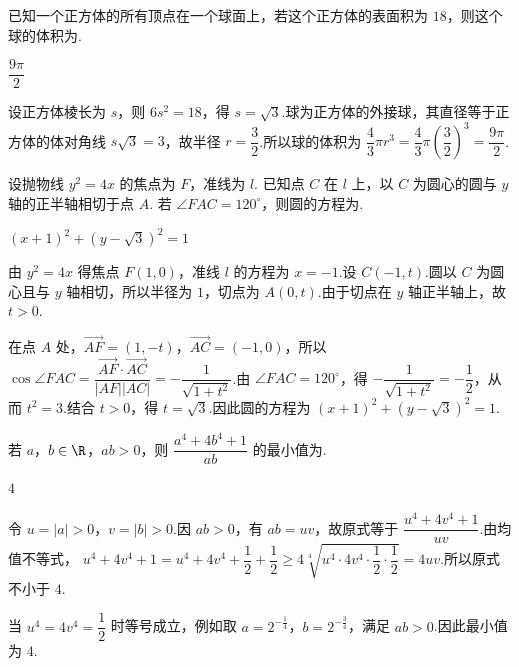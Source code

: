 \begin{problem}
已知一个正方体的所有顶点在一个球面上，若这个正方体的表面积为 \(18\)，则这个球的体积为\fillinblank{}.
\end{problem}

\begin{answer}
\(\dfrac{9\pi}{2}\)
\end{answer}

\begin{solution}
设正方体棱长为 \(s\)，则 \(6s^2=18\)，得 \(s=\sqrt3\).球为正方体的外接球，其直径等于正方体的体对角线 \(s\sqrt3=3\)，故半径 \(r=\dfrac32\).所以球的体积为 \(\dfrac43\pi r^3=\dfrac43\pi\left(\dfrac32\right)^3=\dfrac{9\pi}{2}\).
\end{solution}

\begin{problem}
设抛物线 \(y^2=4x\) 的焦点为 \(F\)，准线为 \(l\). 已知点 \(C\) 在 \(l\) 上，以 \(C\) 为圆心的圆与 \(y\) 轴的正半轴相切于点 \(A\). 若 \(\angle FAC=120^\circ\)，则圆的方程为\fillinblank{}.
\end{problem}

\begin{answer}
\(\left(x+1\right)^2+\left(y-\sqrt{3}\right)^2=1\)
\end{answer}

\begin{solution}
由 \(y^2=4x\) 得焦点 \(F(1,0)\)，准线 \(l\) 的方程为 \(x=-1\).设 \(C(-1,t)\).圆以 \(C\) 为圆心且与 \(y\) 轴相切，所以半径为 \(1\)，切点为 \(A(0,t)\).由于切点在 \(y\) 轴正半轴上，故 \(t>0\).

在点 \(A\) 处，\(\overrightarrow{AF}=(1,-t)\)，\(\overrightarrow{AC}=(-1,0)\)，所以
\(\cos\angle FAC=\dfrac{\overrightarrow{AF}\cdot\overrightarrow{AC}}{|AF||AC|}=-\dfrac1{\sqrt{1+t^2}}\).由 \(\angle FAC=120^\circ\)，得 \(-\dfrac1{\sqrt{1+t^2}}=-\dfrac12\)，从而 \(t^2=3\).结合 \(t>0\)，得 \(t=\sqrt3\).因此圆的方程为 \(\left(x+1\right)^2+\left(y-\sqrt3\right)^2=1\).
\end{solution}

\begin{problem}
若 \(a\)，\(b\in\R\)，\(ab>0\)，则 \(\dfrac{a^4+4b^4+1}{ab}\) 的最小值为\fillinblank{}.
\end{problem}

\begin{answer}
\(4\)
\end{answer}

\begin{solution}
令 \(u=|a|>0\)，\(v=|b|>0\).因 \(ab>0\)，有 \(ab=uv\)，故原式等于 \(\dfrac{u^4+4v^4+1}{uv}\).由均值不等式，
\(u^4+4v^4+1=u^4+4v^4+\dfrac12+\dfrac12\ge4\sqrt[4]{u^4\cdot4v^4\cdot\dfrac12\cdot\dfrac12}=4uv\).所以原式不小于 \(4\).

当 \(u^4=4v^4=\dfrac12\) 时等号成立，例如取 \(a=2^{-\frac{1}{4}}\)，\(b=2^{-\frac{3}{4}}\)，满足 \(ab>0\).因此最小值为 \(4\).
\end{solution}

